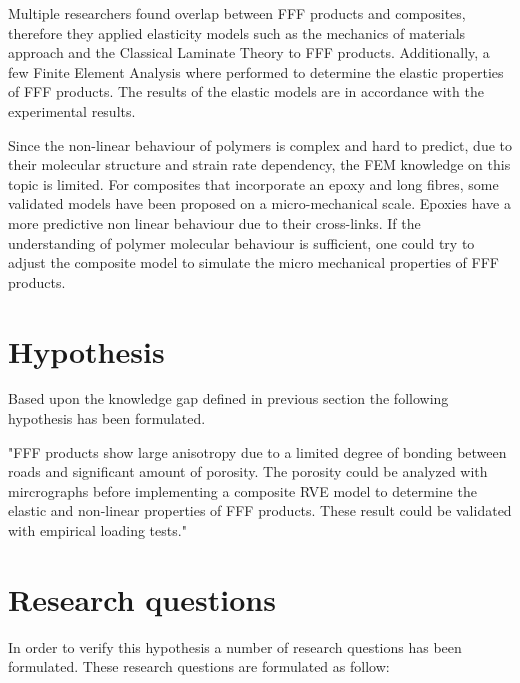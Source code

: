 Multiple researchers found overlap between FFF products and composites, therefore they applied elasticity models such as the mechanics of materials approach and the Classical Laminate Theory to FFF products. Additionally, a few Finite Element Analysis where performed to determine the elastic properties of FFF products. The results of the elastic models are in accordance with the experimental results.

Since the non-linear behaviour of polymers is complex and hard to predict, due to their molecular structure and strain rate dependency, the FEM knowledge on this topic is limited. For composites that incorporate an epoxy and long fibres, some validated models have been proposed on a micro-mechanical scale.  Epoxies have a more predictive non linear behaviour due to their cross-links. If the understanding of polymer molecular behaviour is sufficient, one could try to adjust the composite model to simulate the micro mechanical properties of FFF products. 

\section{Hypothesis}
Based upon the knowledge gap defined in previous section the following hypothesis has been formulated.

"FFF products show large anisotropy due to a limited degree of bonding between roads and significant amount of porosity. The porosity could be analyzed with mircrographs before implementing a composite RVE model to determine the elastic and non-linear properties of FFF products. These result could be validated with empirical loading tests."


\section{Research questions}
    \label{Research questions}
In order to verify this hypothesis a number of research questions has been formulated. These research questions are formulated as follow:

